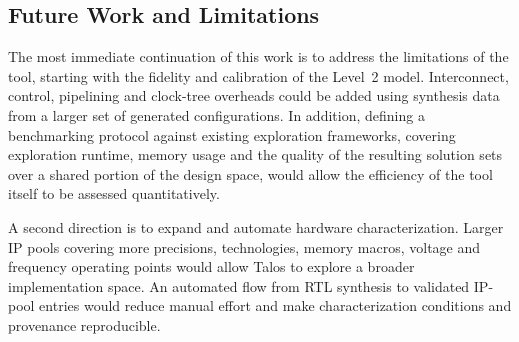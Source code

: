 %
%
%
%

\subsection{Future Work and Limitations}

The most immediate continuation of this work is to address the
limitations of the tool, starting with the fidelity and calibration
of the Level~2 model. Interconnect, control,
pipelining and clock-tree overheads could be added using synthesis data
from a larger set of generated configurations. In addition, defining a
benchmarking protocol against existing exploration frameworks, covering
exploration runtime, memory usage and the quality of the resulting
solution sets over a shared portion of the design space, would allow
the efficiency of the tool itself to be assessed quantitatively.

A second direction is to expand and automate hardware
characterization. Larger IP pools covering more precisions,
technologies, memory macros, voltage and frequency operating points would allow Talos
to explore a broader implementation space. An automated flow from RTL
synthesis to validated IP-pool entries would reduce manual effort and
make characterization conditions and provenance reproducible.

